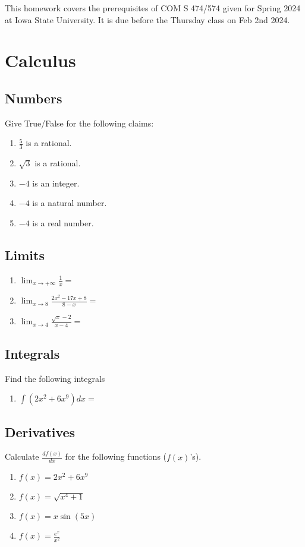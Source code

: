 \documentclass{assignment}
\date{}
\begin{document}
\begin{problem}
This homework covers the prerequisites of COM S 474/574 given for Spring 2024 at Iowa State University. It is due before the Thursday class on Feb 2nd 2024.

\section{Calculus}

\subsection{Numbers}
Give True/False for the following claims:
\begin{enumerate}
    \item $\frac{5}{3}$ is a rational.
    \item $\sqrt{3}$ is a rational.
    \item $-4$ is an integer.
    \item $-4$ is a natural number.
    \item $-4$ is a real number.
\end{enumerate}

\subsection{Limits}
\begin{enumerate}
    \item $\lim_{x\rightarrow +\infty} \frac{1}{x} =$ 
    \item $\lim_{x\rightarrow8} \frac{2x^2-17x+8}{8-x} =$
    \item $\lim_{x\rightarrow4} \frac{\sqrt{x}-2}{x-4} = $
\end{enumerate}

\subsection{Integrals}
\noindent Find the following integrals
\begin{enumerate}
    \item $\int (2x^2 + 6x^9) dx = $
\end{enumerate}

\subsection{Derivatives}
\noindent Calculate $\frac{df(x)}{dx}$ for the following functions ($f(x)$'s).
\begin{enumerate}
    \item $f(x) = 2x^2 + 6x^9$
    \item $f(x) = \sqrt{x^4 + 1}$
    \item $f(x) = x \sin{(5x)}$
    \item $f(x) = \frac{e^x}{x^2}$
\end{enumerate}
\newpage

\end{problem}
\end{document}
